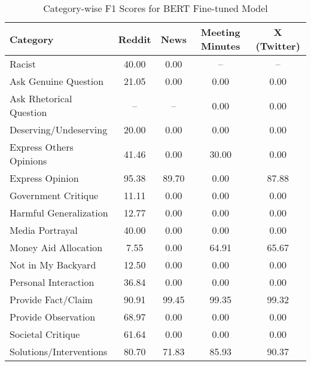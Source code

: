 \begin{table*}[htbp]
\centering
\begin{tabular}{l *{4}{c}}
\toprule
Category & Reddit & News & Meeting Minutes & X (Twitter) \\
\midrule
Racist & 40.00 & 0.00 & -- & -- \\
Ask Genuine Question & 21.05 & 0.00 & 0.00 & 0.00 \\
Ask Rhetorical Question & -- & -- & 0.00 & 0.00 \\
Deserving/Undeserving & 20.00 & 0.00 & 0.00 & 0.00 \\
Express Others Opinions & 41.46 & 0.00 & 30.00 & 0.00 \\
Express Opinion & 95.38 & 89.70 & 0.00 & 87.88 \\
Government Critique & 11.11 & 0.00 & 0.00 & 0.00 \\
Harmful Generalization & 12.77 & 0.00 & 0.00 & 0.00 \\
Media Portrayal & 40.00 & 0.00 & 0.00 & 0.00 \\
Money Aid Allocation & 7.55 & 0.00 & 64.91 & 65.67 \\
Not in My Backyard & 12.50 & 0.00 & 0.00 & 0.00 \\
Personal Interaction & 36.84 & 0.00 & 0.00 & 0.00 \\
Provide Fact/Claim & 90.91 & 99.45 & 99.35 & 99.32 \\
Provide Observation & 68.97 & 0.00 & 0.00 & 0.00 \\
Societal Critique & 61.64 & 0.00 & 0.00 & 0.00 \\
Solutions/Interventions & 80.70 & 71.83 & 85.93 & 90.37 \\
\bottomrule
\end{tabular}
\centering\caption{Category-wise F1 Scores for BERT Fine-tuned Model}
\label{tab:bert_category_breakdown}
\end{table*}